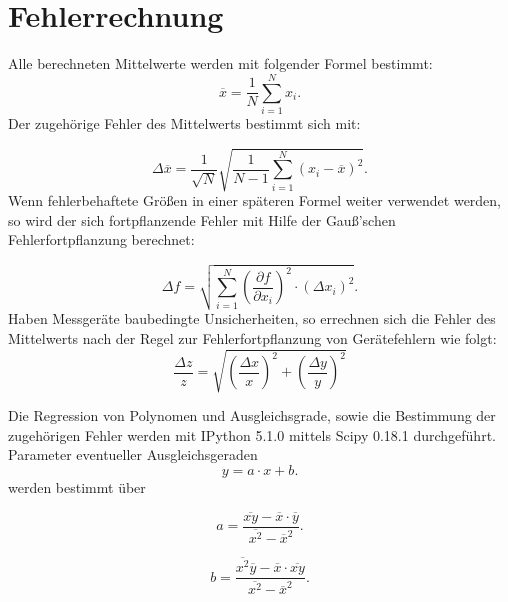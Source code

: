 \section{Fehlerrechnung}
\label{sec:fehlerrechnung}
Alle berechneten Mittelwerte werden mit folgender Formel bestimmt:
\begin{equation}
  \label{eqn:mittelwert}
  \overline x=\frac{1}{N}\sum \limits_{i=1}^{N} x_i .
\end{equation}
Der zugehörige Fehler des Mittelwerts bestimmt sich mit:

\begin{equation}
  \label{eqn:mittelwertfehler}
  \Delta \overline x= \frac{1}{\sqrt{N}} \sqrt{\frac{1}{N-1} \sum \limits_{i=1}^{N} (x_i- \overline x)^2}.
\end {equation}
Wenn fehlerbehaftete Größen in einer späteren Formel weiter verwendet werden, so wird der sich fortpflanzende Fehler
mit Hilfe der Gauß’schen Fehlerfortpflanzung berechnet:

\begin{equation}
  \label{eqn:fehlerfortpflanzung}
  \Delta f = \sqrt{ \sum \limits_{i = 1}^{N} (\frac{\partial f}{\partial x_i})^2 \cdot (\Delta x_i)^2}.
\end{equation}
Haben Messgeräte baubedingte Unsicherheiten, so errechnen sich die Fehler des Mittelwerts nach der Regel zur Fehlerfortpflanzung von Gerätefehlern wie folgt:
 \begin{equation}
   \frac{\Delta z}{z}=\sqrt{(\frac{\Delta x}{x})^2+(\frac{\Delta y}{y})^2}
\end{equation}

Die Regression von Polynomen und Ausgleichsgrade, sowie die Bestimmung der zugehörigen Fehler werden mit
IPython 5.1.0 mittels Scipy 0.18.1 durchgeführt.
Parameter eventueller Ausgleichsgeraden
\begin{equation}
\label{eqn:ausgleichsgrade}
y=a \cdot x +b .
\end{equation}
werden bestimmt über

\begin{equation}
\label{eqn:ausgleichsgrade_a}
a= \frac{ \overline{xy}- \overline{x} \cdot \overline{y}}{\overline{x^2}-\overline{x}^2} .
\end{equation}

\begin{equation}
\label{eqn:ausgleichsgrade_b}
b= \frac{ \overline{x^2} \overline{y}- \overline{x} \cdot \overline{xy}}{\overline{x^2}-\overline{x}^2} .
\end{equation}
